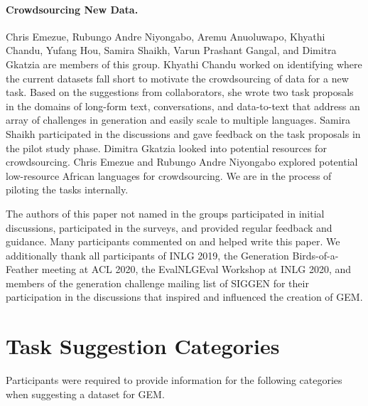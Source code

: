 \documentclass[11pt,a4paper]{article}
\newcommand{\GEM}{\textsc{GEM}}
\begin{document}
\paragraph{Crowdsourcing New Data.} Chris Emezue, Rubungo Andre Niyongabo, Aremu Anuoluwapo, Khyathi Chandu, Yufang Hou, Samira Shaikh, Varun Prashant Gangal, and Dimitra Gkatzia are members of this group. Khyathi Chandu worked on identifying where the current datasets fall short to motivate the crowdsourcing of data for a new task. Based on the suggestions from collaborators, she wrote two task proposals in the domains of long-form text, conversations, and data-to-text that address an array of challenges in generation and easily scale to multiple languages. Samira Shaikh participated in the discussions and gave feedback on the task proposals in the pilot study phase. Dimitra Gkatzia looked into potential resources for crowdsourcing. Chris Emezue and Rubungo Andre Niyongabo explored potential low-resource African languages for crowdsourcing.  We are in the process of piloting the tasks internally.


\vspace{1em}
\noindent The authors of this paper not named in the groups participated in initial discussions, participated in the surveys, and provided regular feedback and guidance. Many participants commented on and helped write this paper. We additionally thank all participants of INLG 2019, the Generation Birds-of-a-Feather meeting at ACL 2020, the EvalNLGEval Workshop at INLG 2020, and members of the generation challenge mailing list of SIGGEN for their participation in the discussions that inspired and influenced the creation of \GEM. 







\appendix 

\section{Task Suggestion Categories}
\label{app:suggestion}
Participants were required to provide information for the following categories when suggesting a dataset for \GEM.
\end{document}
